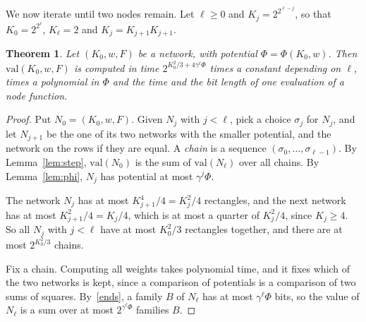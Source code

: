\documentclass[11pt]{article}
\newtheorem{theorem}{Theorem}
\newcommand{\val}{\mathrm{val}}
\begin{document}
We now iterate until two nodes remain. Let $\ell\ge0$ and $K_j=2^{2^{\ell-j}}$, so that $K_0=2^{2^\ell}$, $K_\ell=2$ and $K_j=K_{j+1}K_{j+1}$.

\begin{theorem}\label{thm:net}
Let $(K_0,w,F)$ be a network, with potential $\Phi=\Phi(K_0,w)$. Then $\val(K_0,w,F)$ is computed in time $2^{K_0^2/3+4\gamma^\ell\Phi}$ times a constant depending on $\ell$, times a polynomial in $\Phi$ and the time and the bit length of one evaluation of a node function.
\end{theorem}

\begin{proof}
Put $N_0=(K_0,w,F)$. Given $N_j$ with $j<\ell$, pick a choice $\sigma_j$ for $N_j$, and let $N_{j+1}$ be the one of its two networks with the smaller potential, and the network on the rows if they are equal. A \emph{chain} is a sequence $(\sigma_0,\dots,\sigma_{\ell-1})$. By Lemma~\ref{lem:step}, $\val(N_0)$ is the sum of $\val(N_\ell)$ over all chains. By Lemma~\ref{lem:phi}, $N_j$ has potential at most $\gamma^j\Phi$.

The network $N_j$ has at most $K_{j+1}^4/4=K_j^2/4$ rectangles, and the next network has at most $K_{j+1}^2/4=K_j/4$, which is at most a quarter of $K_j^2/4$, since $K_j\ge4$. So all $N_j$ with $j<\ell$ have at most $K_0^2/3$ rectangles together, and there are at most $2^{K_0^2/3}$ chains.

Fix a chain. Computing all weights takes polynomial time, and it fixes which of the two networks is kept, since a comparison of potentials is a comparison of two sums of squares. By~\eqref{ends}, a family $B$ of $N_\ell$ has at most $\gamma^\ell\Phi$ bits, so the value of $N_\ell$ is a sum over at most $2^{\gamma^\ell\Phi}$ families $B$.


\end{proof}
\end{document}
